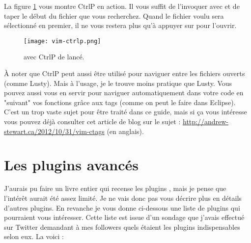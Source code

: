 La figure \ref{fig:vim-ctrlp} vous montre CtrlP en action. Il vous suffit de l'invoquer avec  et de taper le début du fichier que vous recherchez. Quand le fichier voulu sera sélectionné en premier, il ne vous restera plus qu'à appuyer sur \ttenter pour l'ouvrir.

\begin{figure}
  \texttt{[image: vim-ctrlp.png]}
  \caption{\vim avec CtrlP de lancé.}
  \label{fig:vim-ctrlp}
\end{figure}

À noter que CtrlP peut aussi être utilisé pour naviguer entre les fichiers ouverts (comme Lusty). Mais à l'usage, je le trouve moins pratique que Lusty. Vous pouvez aussi vous en servir pour naviguer automatiquement dans votre code en "suivant" vos fonctions grâce aux tags (comme on peut le faire dans Eclipse). C'est un trop vaste sujet pour être traité dans ce guide, mais si ça vous intéresse vous pouvez déjà consulter cet article de blog sur le sujet : \url{http://andrew-stewart.ca/2012/10/31/vim-ctags} (en anglais).

\section{Les plugins avancés}

J'aurais pu faire un livre entier qui recense les plugins \vim, mais je pense que l'intérêt aurait été assez limité. Je ne vais donc pas vous décrire plus en détails d'autres plugins. En revanche je vous donne ci-dessous une liste de plugins qui pourraient vous intéresser. Cette liste est issue d'un sondage que j'avais effectué sur Twitter demandant à mes followers quels étaient les plugins \vim indispensables selon eux. La voici :


